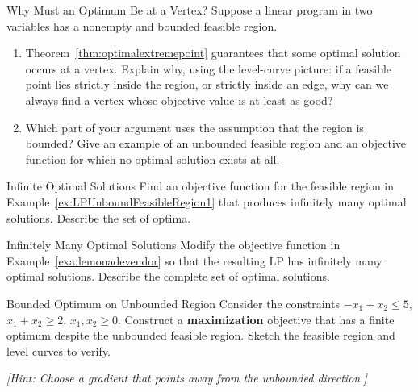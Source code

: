 
\begin{ex}{Why Must an Optimum Be at a Vertex?}{}\label{ex:why-vertex}
Suppose a linear program in two variables has a nonempty and bounded feasible region.
\begin{enumerate}
\item Theorem~\ref{thm:optimalextremepoint} guarantees that some optimal solution occurs at a vertex. Explain why, using the level-curve picture: if a feasible point lies strictly inside the region, or strictly inside an edge, why can we always find a vertex whose objective value is at least as good?
\item Which part of your argument uses the assumption that the region is bounded? Give an example of an unbounded feasible region and an objective function for which no optimal solution exists at all.
\end{enumerate}
\end{ex}

\begin{ex}{Infinite Optimal Solutions}{}
Find an objective function for the feasible region in Example~\ref{ex:LPUnboundFeasibleRegion1} that produces infinitely many optimal solutions. Describe the set of optima.
\exrefs{\S\ref{sec:infinitely-many-optima}}
\end{ex}

\begin{ex}{Infinitely Many Optimal Solutions}{}
Modify the objective function in Example~\ref{exa:lemonadevendor} so that the resulting LP has infinitely many optimal solutions. Describe the complete set of optimal solutions.
\end{ex}

\begin{ex}{Bounded Optimum on Unbounded Region}{}
Consider the constraints $-x_1+x_2\leq 5$, $x_1+x_2\geq 2$, $x_1,x_2\geq 0$. Construct a \textbf{maximization} objective that has a finite optimum despite the unbounded feasible region. Sketch the feasible region and level curves to verify.

\emph{[Hint: Choose a gradient that points away from the unbounded direction.]}
\end{ex}

